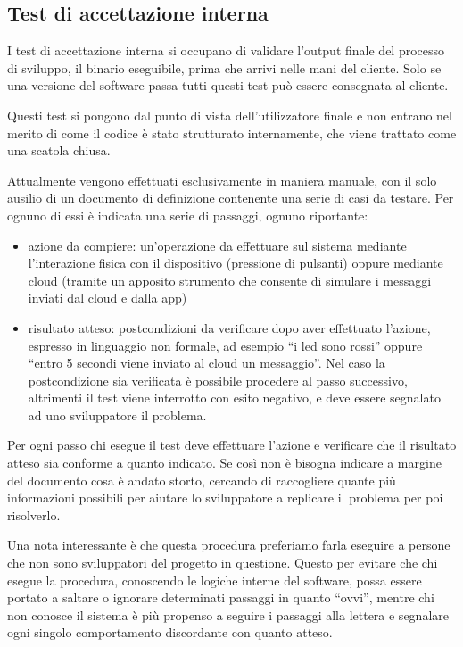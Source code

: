 \documentclass[12pt,a4paper,twoside,titlepage]{book}
\begin{document}
\subsection{Test di accettazione interna}
\label{subsection:test_accettazione_interna}

I test di accettazione interna si occupano di validare l'output finale del processo di sviluppo, 
il binario eseguibile, prima che arrivi nelle mani del cliente.  
Solo se una versione del software passa tutti questi test può essere consegnata al cliente.

Questi test si pongono dal punto di vista dell'utilizzatore finale e non entrano nel merito di come 
il codice è stato strutturato internamente, che viene trattato come una scatola chiusa. 

Attualmente vengono effettuati esclusivamente in maniera manuale, con il solo ausilio di un documento
di definizione contenente una serie di casi da testare. Per ognuno di essi è indicata una serie di 
passaggi, ognuno riportante:

\begin{itemize}
    \item azione da compiere: un'operazione da effettuare sul sistema mediante l'interazione fisica
        con il dispositivo (pressione di pulsanti) oppure mediante cloud (tramite un apposito
        strumento che consente di simulare i messaggi inviati dal cloud e dalla app)
    \item risultato atteso: postcondizioni da verificare dopo aver effettuato l'azione, espresso in
        linguaggio non formale, ad esempio ``i \acrshort{led} sono rossi'' oppure ``entro 5 secondi viene inviato al cloud un messaggio''.
        Nel caso la postcondizione sia verificata è possibile procedere al passo successivo, altrimenti
        il test viene interrotto con esito negativo, e deve essere segnalato ad uno sviluppatore il problema.
\end{itemize}

Per ogni passo chi esegue il test deve effettuare l'azione e verificare che il risultato atteso sia 
conforme a quanto indicato. Se così non è bisogna indicare a margine del documento cosa è andato 
storto, cercando di raccogliere quante più informazioni possibili per aiutare lo sviluppatore a replicare 
il problema per poi risolverlo. 

Una nota interessante è che questa procedura preferiamo farla eseguire a persone che non sono 
sviluppatori del progetto in questione. Questo per evitare che chi esegue la procedura, conoscendo
le logiche interne del software, possa essere portato a saltare o ignorare determinati
passaggi in quanto ``ovvi'', mentre chi non conosce il sistema è più propenso a seguire
i passaggi alla lettera e segnalare ogni singolo comportamento discordante con quanto
atteso.
\end{document}
